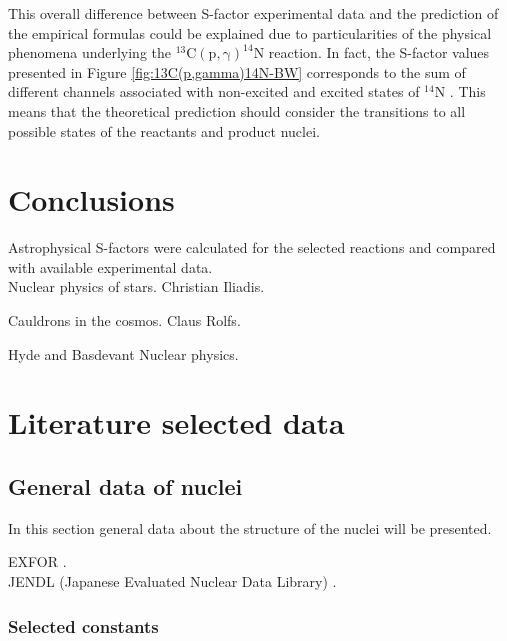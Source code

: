 \documentclass[openany]{book}
\begin{document}
This overall difference between S-factor experimental data and the prediction of the empirical formulas could be explained due to particularities of the physical phenomena underlying the $\mathrm{{}^{13}C(p, \gamma)^{14}N}$ reaction. In fact, the S-factor values presented in Figure \ref{fig:13C(p,gamma)14N-BW} corresponds to the sum of different channels associated with non-excited and excited states of  $\mathrm{{}^{14}N}$ \cite{xu_takahashi_goriely_arnould_ohta_utsunomiya_2013}. This means that the theoretical prediction should consider the transitions to all possible states of the reactants and product nuclei. 



\chapter{Conclusions} \label{ch:conclusions}

Astrophysical S-factors were calculated for the selected reactions and compared with available experimental data.  \\

Nuclear physics of stars. Christian Iliadis.

\vspace{1in}
Cauldrons in the cosmos.  Claus Rolfs.

\vspace{1in}
Hyde and Basdevant Nuclear physics.

\appendix

\chapter{Literature selected data} \label{ap:literatureData}

\section{General data of nuclei} \label{sec:nucleiData}

In this section general data about the structure of the nuclei will be presented. 

EXFOR \cite{zerkin_pritychenko_totans_vrapcenjak_rodionov_shulyak_2022}. \\
JENDL (Japanese Evaluated Nuclear Data Library) \cite{iwamoto_iwamoto_shibata_ichihara_kunieda_minato_nakayama_2020}.

\subsection{Selected constants} \label{sub:selectedConstants}
\end{document}
